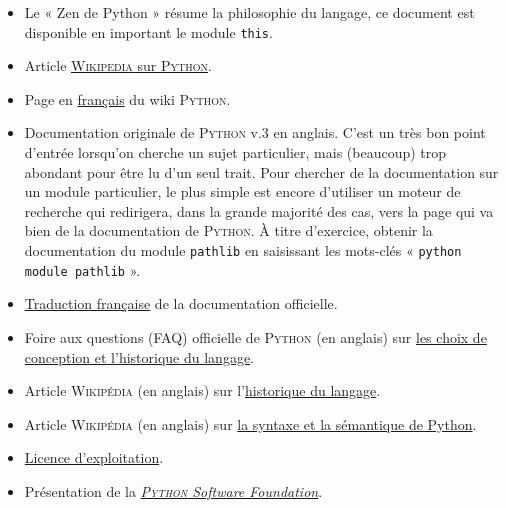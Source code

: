\begin{gofurther}
\begin{itemize}\jazzitem
	\item Le « Zen de Python » résume la philosophie du langage, ce document est disponible en important le module \texttt{this}.
\end{itemize}
\begin{itemize}\jazzitem
	\item Article \href{https://fr.wikipedia.org/wiki/Python_\%28langage\%29}{\textsc{Wikipedia} sur \textsc{Python}}.
	\item Page en \href{https://wiki.python.org/moin/FrenchLanguage}{français} du wiki \textsc{Python}.
	\item Documentation originale de \textsc{Python} v.3 en anglais. C'est un très bon point d'entrée lorsqu'on cherche un sujet particulier, mais (beaucoup) trop abondant pour être lu d'un seul trait. Pour chercher de la documentation sur un module particulier, le plus simple est encore d'utiliser un moteur de recherche qui redirigera, dans la grande majorité des cas, vers la page qui va bien de la documentation de \textsc{Python}.
À titre d'exercice, obtenir la documentation du module \texttt{pathlib} en saisissant les mots-clés « \texttt{python module pathlib} ».
	\item \href{https://docs.python.org/fr/3/}{Traduction française} de la documentation officielle.
\end{itemize}
\begin{itemize}\jazzitem
	\item Foire aux questions (FAQ) officielle de \textsc{Python} (en anglais) sur \href{https://docs.python.org/3/faq/design.html}{les choix de conception et l'historique du langage}.
	\item Article \textsc{Wikipédia} (en anglais) sur l'\href{https://en.wikipedia.org/wiki/History_of_Python}{historique du langage}.
	\item Article \textsc{Wikipédia} (en anglais) sur \href{https://en.wikipedia.org/wiki/Python_syntax_and_semantics}{la syntaxe et la sémantique de Python}.
\end{itemize}
\begin{itemize}\jazzitem
	\item \href{https://docs.python.org/3/license.html}{Licence d'exploitation}.
	\item Présentation de la \href{https://www.python.org/psf/}{\textit{\textsc{Python} Software Foundation}}.

\end{itemize}
\end{gofurther}
